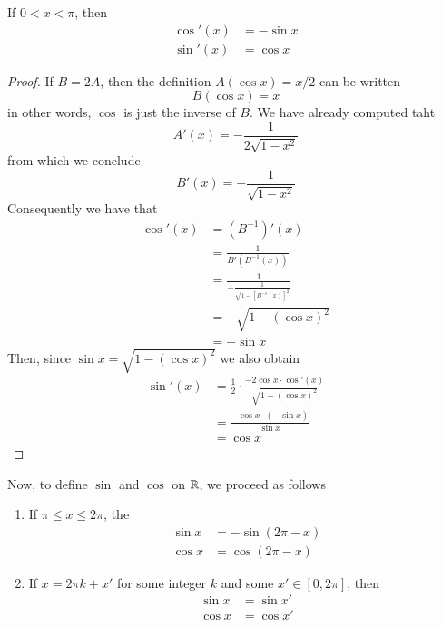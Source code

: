 \documentclass[12pt, a4paper, oneside, openright, titlepage]{book}
\begin{document}
\begin{subappendices}
    \begin{thm}
        If $0 < x < \pi$, then \begin{align*}
            \cos'(x) &= -\sin x \\
            \sin'(x) &= \cos x
        \end{align*}
    \end{thm}
    \begin{proof}
        If $B = 2A$, then the definition $A(\cos x) = x/2$ can be written \begin{equation*}
            B(\cos x) = x
        \end{equation*}
        in other words, $\cos$ is just the inverse of $B$. We have already computed taht \begin{equation*}
            A'(x) = -\frac{1}{2\sqrt{1-x^2}}
        \end{equation*}
        from which we conclude \begin{equation*}
            B'(x) = -\frac{1}{\sqrt{1-x^2}}
        \end{equation*}
        Consequently we have that \begin{align*}
            \cos'(x) &= (B^{-1})'(x) \\
            &= \frac{1}{B'(B^{-1}(x))} \\
            &= \frac{1}{-\frac{1}{\sqrt{1-[B^{-1}(x)]^2}}} \\
            &= -\sqrt{1-(\cos x)^2} \\
            &= - \sin x
        \end{align*}
        Then, since $\sin x = \sqrt{1-(\cos x)^2}$ we also obtain \begin{align*}
            \sin'(x) &= \frac{1}{2}\cdot \frac{-2\cos x\cdot \cos'(x)}{\sqrt{1-(\cos x)^2}} \\
            &= \frac{-\cos x\cdot (-\sin x)}{\sin x}\\
            &= \cos x
        \end{align*}
    \end{proof}
    

    \begin{defn}
        Now, to define $\sin$ and $\cos$ on $\mathbb R$, we proceed as follows \begin{enumerate}
            \item If $\pi \leq x \leq 2\pi$, the \begin{align*}
                    \sin x &= -\sin(2\pi - x) \\
                    \cos x &= \cos(2\pi - x)
                \end{align*}
            \item If $x = 2\pi k+x'$ for some integer $k$ and some $x' \in [0,2\pi]$, then \begin{align*}
                    \sin x &= \sin x' \\
                    \cos x &= \cos x'
            \end{align*}
        \end{enumerate}
    \end{defn}



\end{subappendices}
\end{document}
